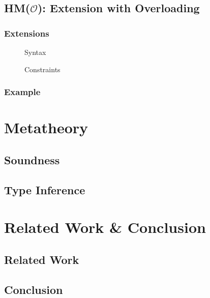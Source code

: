 \documentclass[runningheads]{llncs}
\newcommand{\hmo}{HM($\mathcal{O}$)}
\begin{document}
\subsection{\hmo{}: Extension with Overloading}
\subsubsection{Extensions}
\begin{figure}[t]
  \centering
  \caption{Syntax}
\end{figure}
\begin{figure}[t]
  \centering
  \caption{Constraints}
\end{figure}
\subsubsection{Example}
\section{Metatheory}
\subsection{Soundness}
\subsection{Type Inference}
\section{Related Work \& Conclusion}
\subsection{Related Work}
\subsection{Conclusion}

\nocite{hmx}
\nocite{sts}
\nocite{atapl}
\printbibliography{}
\end{document}
